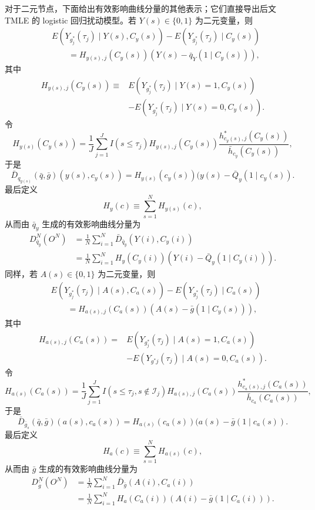 对于二元节点，下面给出有效影响曲线分量的其他表示；它们直接导出后文 TMLE 的 logistic 回归扰动模型。若 $Y(s)\in\{0,1\}$ 为二元变量，则
\[
\begin{aligned}
 &E(Y_{g_j^*}(\tau_j)\mid Y(s),C_y(s))-E(Y_{g_j^*}(\tau_j)\mid C_y(s))\\
 &\qquad=H_{y(s),j}(C_y(s))(Y(s)-\bar q_Y(1\mid C_y(s))),
\end{aligned}
\]
其中
\[
\begin{aligned}
 H_{y(s),j}(C_y(s))\equiv{}&E(Y_{g_j^*}(\tau_j)\mid Y(s)=1,C_y(s))\\
 &-E(Y_{g_j^*}(\tau_j)\mid Y(s)=0,C_y(s)).
\end{aligned}
\]
令
\[
 H_{y(s)}(C_y(s))=\frac1J\sum_{j=1}^J I(s\leq\tau_j)
 H_{y(s),j}(C_y(s))\frac{h^*_{c_y(s),j}(C_y(s))}{\bar h_{c_y}(C_y(s))},
\]
于是
\[
 \bar D_{q_{y(s)}}(\bar q,\bar g)(y(s),c_y(s))
 =H_{y(s)}(c_y(s))(y(s)-\bar Q_y(1\mid c_y(s)).
\]
最后定义
\begin{equation}
 H_y(c)\equiv\sum_{s=1}^N H_{y(s)}(c),
 \tag{19.1}
\end{equation}
从而由 $\bar q_y$ 生成的有效影响曲线分量为
\[
\begin{aligned}
 D^N_{\bar q_y}(O^N)
 &=\frac1N\sum_{i=1}^N\bar D_{\bar q_y}(Y(i),C_y(i))\\
 &=\frac1N\sum_{i=1}^N H_y(C_y(i))(Y(i)-\bar Q_y(1\mid C_y(i))).
\end{aligned}
\]
同样，若 $A(s)\in\{0,1\}$ 为二元变量，则
\[
\begin{aligned}
 &E(Y_{g_j^*}(\tau_j)\mid A(s),C_a(s))-E(Y_{g_j^*}(\tau_j)\mid C_a(s))\\
 &\qquad=H_{a(s),j}(C_a(s))(A(s)-\bar g(1\mid C_y(s))),
\end{aligned}
\]
其中
\[
\begin{aligned}
 H_{a(s),j}(C_a(s))={}&E(Y_{g_j^*}(\tau_j)\mid A(s)=1,C_a(s))\\
 &-E(Y_{g^*j}(\tau_j)\mid A(s)=0,C_a(s)).
\end{aligned}
\]
令
\[
 H_{a(s)}(C_a(s))=\frac1J\sum_{j=1}^J I(s\leq\tau_j,s\notin\mathcal I_j)
 H_{a(s),j}(C_a(s))\frac{h^*_{c_a(s),j}(C_a(s))}{\bar h_{c_a}(C_a(s))},
\]
于是
\[
 \bar D_{\bar g_s}(\bar q,\bar g)(a(s),c_a(s))
 =H_{a(s)}(c_a(s))(a(s)-\bar g(1\mid c_a(s)).
\]
最后定义
\begin{equation}
 H_a(c)\equiv\sum_{s=1}^N H_{a(s)}(c),
 \tag{19.2}
\end{equation}
从而由 $\bar g$ 生成的有效影响曲线分量为
\[
\begin{aligned}
 D^N_{\bar g}(O^N)
 &=\frac1N\sum_{i=1}^N\bar D_{\bar g}(A(i),C_a(i))\\
 &=\frac1N\sum_{i=1}^N H_a(C_a(i))(A(i)-\bar g(1\mid C_a(i))).
\end{aligned}
\]
